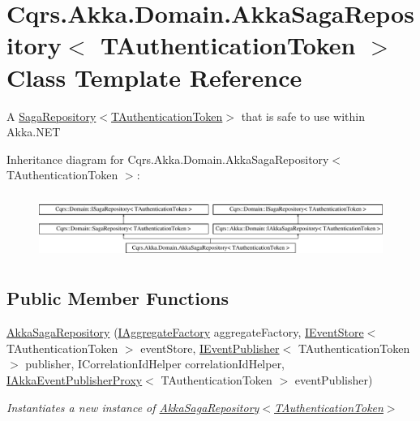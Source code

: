 \hypertarget{classCqrs_1_1Akka_1_1Domain_1_1AkkaSagaRepository}{}\section{Cqrs.\+Akka.\+Domain.\+Akka\+Saga\+Repository$<$ T\+Authentication\+Token $>$ Class Template Reference}
\label{classCqrs_1_1Akka_1_1Domain_1_1AkkaSagaRepository}


A \hyperlink{classCqrs_1_1Domain_1_1SagaRepository_a2981231b25fa89133ab50796cd352fbf_a2981231b25fa89133ab50796cd352fbf}{Saga\+Repository$<$\+T\+Authentication\+Token$>$} that is safe to use within Akka.\+N\+ET  


Inheritance diagram for Cqrs.\+Akka.\+Domain.\+Akka\+Saga\+Repository$<$ T\+Authentication\+Token $>$\+:\begin{figure}[H]
\begin{center}
\leavevmode
\includegraphics[height=2.105263cm]{classCqrs_1_1Akka_1_1Domain_1_1AkkaSagaRepository}
\end{center}
\end{figure}
\subsection*{Public Member Functions}
\begin{DoxyCompactItemize}
\item 
\hyperlink{classCqrs_1_1Akka_1_1Domain_1_1AkkaSagaRepository_a8297f64e2b7a7be7bcc999c89dcece05_a8297f64e2b7a7be7bcc999c89dcece05}{Akka\+Saga\+Repository} (\hyperlink{interfaceCqrs_1_1Domain_1_1Factories_1_1IAggregateFactory}{I\+Aggregate\+Factory} aggregate\+Factory, \hyperlink{interfaceCqrs_1_1Events_1_1IEventStore}{I\+Event\+Store}$<$ T\+Authentication\+Token $>$ event\+Store, \hyperlink{interfaceCqrs_1_1Events_1_1IEventPublisher}{I\+Event\+Publisher}$<$ T\+Authentication\+Token $>$ publisher, I\+Correlation\+Id\+Helper correlation\+Id\+Helper, \hyperlink{interfaceCqrs_1_1Akka_1_1Events_1_1IAkkaEventPublisherProxy}{I\+Akka\+Event\+Publisher\+Proxy}$<$ T\+Authentication\+Token $>$ event\+Publisher)
\begin{DoxyCompactList}\small\item\em Instantiates a new instance of \hyperlink{classCqrs_1_1Akka_1_1Domain_1_1AkkaSagaRepository_a8297f64e2b7a7be7bcc999c89dcece05_a8297f64e2b7a7be7bcc999c89dcece05}{Akka\+Saga\+Repository$<$\+T\+Authentication\+Token$>$} \end{DoxyCompactList}\end{DoxyCompactItemize}
